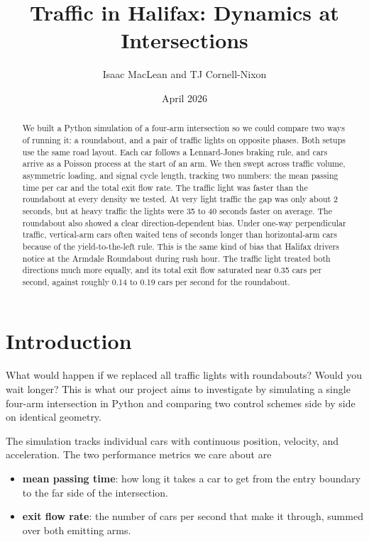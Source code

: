 \documentclass[11pt]{article}
\title{Traffic in Halifax: Dynamics at Intersections}
\author{Isaac MacLean and TJ Cornell-Nixon}
\date{April 2026}
\begin{document}
\maketitle

\begin{abstract}
We built a Python simulation of a four-arm intersection so we could compare two ways of running it: a roundabout, and a pair of traffic lights on opposite phases. Both setups use the same road layout. Each car follows a Lennard-Jones braking rule, and cars arrive as a Poisson process at the start of an arm. We then swept across traffic volume, asymmetric loading, and signal cycle length, tracking two numbers: the mean passing time per car and the total exit flow rate. The traffic light was faster than the roundabout at every density we tested. At very light traffic the gap was only about 2 seconds, but at heavy traffic the lights were 35 to 40 seconds faster on average. The roundabout also showed a clear direction-dependent bias. Under one-way perpendicular traffic, vertical-arm cars often waited tens of seconds longer than horizontal-arm cars because of the yield-to-the-left rule. This is the same kind of bias that Halifax drivers notice at the Armdale Roundabout during rush hour. The traffic light treated both directions much more equally, and its total exit flow saturated near 0.35 cars per second, against roughly 0.14 to 0.19 cars per second for the roundabout.
\end{abstract}

\tableofcontents
\newpage

\section{Introduction}
What would happen if we replaced all traffic lights with roundabouts? Would you wait longer? This is what our project aims to investigate by simulating a single four-arm intersection in Python and comparing two control schemes side by side on identical geometry.

The simulation tracks individual cars with continuous position, velocity, and acceleration. The two performance metrics we care about are
\begin{itemize}
    \item \textbf{mean passing time}: how long it takes a car to get from the entry boundary to the far side of the intersection.
    \item \textbf{exit flow rate}: the number of cars per second that make it through, summed over both emitting arms.
\end{itemize}
\end{document}

